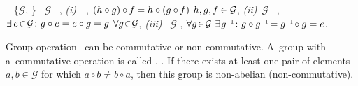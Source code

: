 \emph{}~%
\{\hspace{.3ex}$\mathcal{G}$,\hspace{-0.4ex} \inquotes{$\circ\hspace{.1ex}$}\hspace{.3ex}\}
~$\mathcal{G}$
~\inquotes{$\circ\hspace{.1ex}$},
\textit{(i)}~\inquotes{$\circ\hspace{.1ex}$}~,
${( h \circ g ) \circ \hspace{-0.1ex} f \hspace{-0.1ex} = h \circ ( g \circ \hspace{-0.1ex} f )}$
${h, g, \hspace{-0.1ex} f \hspace{-0.1ex} \in \mathcal{G}}$,
\textit{(ii)}~$\mathcal{G}$~  ,
${\exists \hspace{.4ex} e {\hspace{.3ex} \in \hspace{.3ex}} \mathcal{G} \colon g \circ e = e \circ g = g \hspace{1ex} \forall g {\hspace{.2ex} \in \hspace{.2ex}} \mathcal{G}}$,
\textit{(iii)}~ $\mathcal{G}$   ,
${\forall g {\hspace{.2ex} \in \hspace{.2ex}} \mathcal{G} \hspace{.8ex} \exists \hspace{.2ex} g^{\littleminusone} \colon g \circ g^{\littleminusone} \hspace{-0.25ex} = g^{\littleminusone} \hspace{-0.25ex} \circ g = e}$.

Group operation~\inquotes{$\circ\hspace{.1ex}$}
can be
commutative
or non-commutative.
%
A~group
with a~commutative operation
is called
,
.
%
If there exists
at least one
pair of elements ${a, b \in \mathcal{G}}$
for which ${a \circ b \neq b \circ a}$,
then this group is non-abelian (non-commutative).

